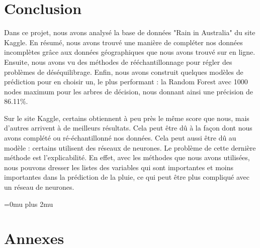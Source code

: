 \documentclass{article}
\begin{document}
\newpage
\part{Conclusion}

Dans ce projet, nous avons analysé la base de données "Rain in Australia" du site Kaggle. En résumé, nous avons trouvé une manière de compléter nos données incomplètes grâce aux données géographiques que nous avons trouvé sur en ligne. Ensuite, nous avons vu des méthodes de rééchantillonnage pour régler des problèmes de déséquilibrage. Enfin, nous avons construit quelques modèles de prédiction pour en choisir un, le plus performant : la Random Forest avec 1000 nodes maximum pour les arbres de décision, nous donnant ainsi une précision de 86.11\%. 

Sur le site Kaggle, certains obtiennent à peu près le même score que nous, mais d'autres arrivent à de meilleurs résultats. Cela peut être dû à la façon dont nous avons complété ou ré-échantillonné nos données. Cela peut aussi être dû au modèle : certains utilisent des réseaux de neurones. Le problème de cette dernière méthode est l'explicabilité. En effet, avec les méthodes que nous avons utilisées, nous pouvons dresser les listes des variables qui sont importantes et moins importantes dans la prédiction de la pluie, ce qui peut être plus compliqué avec un réseau de neurones. 

\newpage
\Urlmuskip=0mu plus 2mu
\printbibliography[heading=subbibliography,title={Articles},type=article]
\printbibliography[heading=subbibliography,title={Librairies R}, type=manual]
\printbibliography[heading=subbibliography,title={Pages Internet}, type=misc]

\newpage
\part{Annexes}
\end{document}
